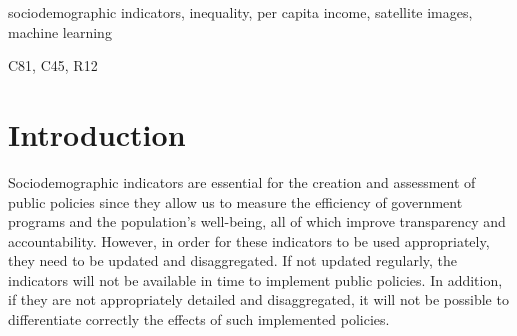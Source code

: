 \documentclass[conference]{IEEEtran}
\renewcommand\IEEEkeywordsname{Palabras clave}
\begin{document}
\begin{abstract}
In this study, we examine the potential of using high-resolution satellite imagery and machine learning techniques to create income maps with a high level of geographic detail. We trained a convolutional neural network with satellite images from the Metropolitan Area of Buenos Aires (Argentina) and 2010 census data to estimate per capita income at a 50x50 meter resolution for 2013, 2018, and 2022. This outperformed the resolution and frequency of available census information. Based on the EfficientnetV2 architecture, the model achieved high accuracy in predicting household incomes ($R^2=0.878$), surpassing the spatial resolution and model performance of other methods used in the existing literature. This approach presents new opportunities for the generation of highly disaggregated data, enabling the assessment of public policies at a local scale, providing tools for better targeting of social programs, and reducing the information gap in areas where data is not collected.
\end{abstract}


\renewcommand\IEEEkeywordsname{Keywords}
\begin{IEEEkeywords}
sociodemographic indicators, inequality, per capita income, satellite images, machine learning
\end{IEEEkeywords}
\renewcommand\IEEEkeywordsname{JEL Codes}
\begin{IEEEkeywords}
C81, C45, R12
\end{IEEEkeywords}


\section{Introduction}

Sociodemographic indicators are essential for the creation and assessment of public policies since they allow us to measure the efficiency of government programs and the population's well-being, all of which improve transparency and accountability. However, in order for these indicators to be used appropriately, they need to be updated and disaggregated. If not updated regularly, the indicators will not be available in time to implement public policies. In addition, if they are not appropriately detailed and disaggregated, it will not be possible to differentiate correctly the effects of such implemented policies.
\end{document}
